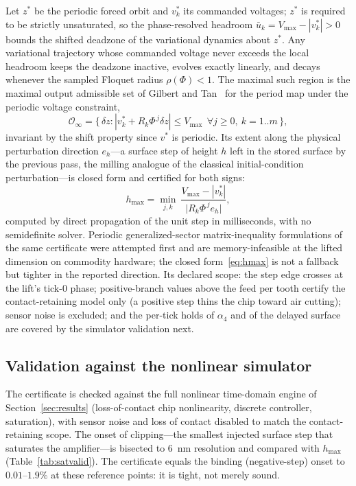 \documentclass[preprint,12pt]{elsarticle}
\begin{document}
Let $z^*$ be the periodic forced orbit and $v^*_k$ its commanded
voltages; $z^*$ is required to be strictly unsaturated, so the
phase-resolved headroom $\bar u_k = V_{\max} - |v^*_k| > 0$ bounds the
shifted deadzone of the variational dynamics about $z^*$. Any
variational trajectory whose commanded voltage never exceeds the local
headroom keeps the deadzone inactive, evolves exactly linearly, and
decays whenever the sampled Floquet radius $\rho(\Phi) < 1$. The
maximal such region is the maximal output admissible set of Gilbert and
Tan~\cite{gilbert1991maximal} for the period map under the periodic
voltage constraint,
\begin{equation}
\mathcal{O}_\infty = \bigl\{\, \delta z : |v^*_k + R_k \Phi^{\,j}
\delta z| \le V_{\max}\ \ \forall j \ge 0,\ k = 1..m \,\bigr\},
\label{eq:oinf}
\end{equation}
invariant by the shift property since $v^*$ is periodic. Its extent
along the physical perturbation direction $e_h$---a surface step of
height $h$ left in the stored surface by the previous pass, the milling
analogue of the classical initial-condition perturbation---is closed
form and certified for both signs:
\begin{equation}
h_{\max} = \min_{j,k}\ \frac{V_{\max} - |v^*_k|}
{\bigl|R_k \Phi^{\,j} e_h\bigr|},
\label{eq:hmax}
\end{equation}
computed by direct propagation of the unit step in milliseconds, with
no semidefinite solver. Periodic generalized-sector matrix-inequality
formulations of the same certificate were attempted first and are
memory-infeasible at the lifted dimension on commodity hardware; the
closed form~\eqref{eq:hmax} is not a fallback but tighter in the
reported direction. Its declared scope: the step edge crosses at the
lift's tick-0 phase; positive-branch values above the feed per tooth
certify the contact-retaining model only (a positive step thins the
chip toward air cutting); sensor noise is excluded; and the per-tick
holds of $\alpha_4$ and of the delayed surface are covered by the
simulator validation next.

\subsection{Validation against the nonlinear simulator}
\label{sec:satvalid}

The certificate is checked against the full nonlinear time-domain
engine of Section~\ref{sec:results} (loss-of-contact chip
nonlinearity, discrete controller, saturation), with sensor noise and
loss of contact disabled to match the contact-retaining scope. The
onset of clipping---the smallest injected surface step that saturates
the amplifier---is bisected to 6~nm resolution and compared with
$h_{\max}$ (Table~\ref{tab:satvalid}). The certificate equals the
binding (negative-step) onset to $0.01$--$1.9\%$ at these reference
points: it is tight, not merely sound.
\end{document}
